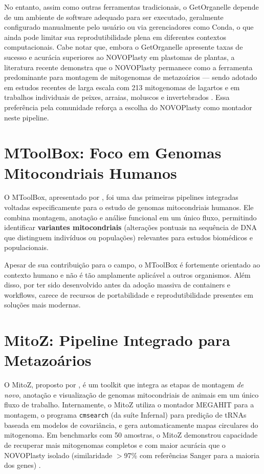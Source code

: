No entanto, assim como outras ferramentas tradicionais, o GetOrganelle depende de um ambiente de software adequado para ser executado, geralmente configurado manualmente pelo usuário ou via gerenciadores como Conda, o que ainda pode limitar sua reprodutibilidade plena em diferentes contextos computacionais. Cabe notar que, embora o GetOrganelle apresente taxas de sucesso e acurácia superiores ao NOVOPlasty em plastomas de plantas, a literatura recente demonstra que o NOVOPlasty permanece como a ferramenta predominante para montagem de mitogenomas de metazoários --- sendo adotado em estudos recentes de larga escala com 213 mitogenomas de lagartos \cite{zhan2024} e em trabalhos individuais de peixes, arraias, moluscos e invertebrados \cite{kundu2024,guerreiro2025,shi2024,tao2024}. Essa preferência pela comunidade reforça a escolha do NOVOPlasty como montador neste pipeline.

\section{MToolBox: Foco em Genomas Mitocondriais Humanos}

O MToolBox, apresentado por , foi uma das primeiras pipelines integradas voltadas especificamente para o estudo de genomas mitocondriais humanos. Ele combina montagem, anotação e análise funcional em um único fluxo, permitindo identificar \textbf{variantes mitocondriais} (alterações pontuais na sequência de DNA que distinguem indivíduos ou populações) relevantes para estudos biomédicos e populacionais.

Apesar de sua contribuição para o campo, o MToolBox é fortemente orientado ao contexto humano e não é tão amplamente aplicável a outros organismos. Além disso, por ter sido desenvolvido antes da adoção massiva de containers e workflows, carece de recursos de portabilidade e reprodutibilidade presentes em soluções mais modernas.

\section{MitoZ: Pipeline Integrado para Metazoários}

O MitoZ, proposto por , é um toolkit que integra as etapas de montagem \textit{de novo}, anotação e visualização de genomas mitocondriais de animais em um único fluxo de trabalho. Internamente, o MitoZ utiliza o montador MEGAHIT para a montagem, o programa \texttt{cmsearch} (da suíte Infernal) para predição de tRNAs baseada em modelos de covariância, e gera automaticamente mapas circulares do mitogenoma. Em benchmarks com 50 amostras, o MitoZ demonstrou capacidade de recuperar mais mitogenomas completos e com maior acurácia que o NOVOPlasty isolado (similaridade $>$97\% com referências Sanger para a maioria dos genes) \cite{meng2019}.

